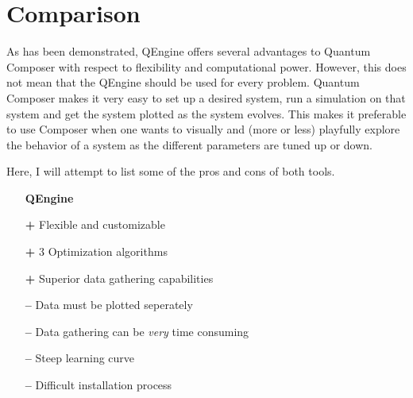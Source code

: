 \documentclass[a4paper, twocolumn]{revtex4-1}
\begin{document}
\section{Comparison}\label{sec:comparison}
As has been demonstrated, QEngine offers several advantages to Quantum Composer with respect to flexibility and computational power. However, this does not mean that the QEngine should be used for every problem. Quantum Composer makes it very easy to set up a desired system, run a simulation on that system and get the system plotted as the system evolves. This makes it preferable to use Composer when one wants to visually and (more or less) playfully explore the behavior of a system as the different parameters are tuned up or down.

Here, I will attempt to list some of the pros and cons of both tools.
\begin{itemize}
	\item[] \textbf{QEngine} 
	\item[\bf+] Flexible and customizable
	\item[\bf+] 3 Optimization algorithms
	\item[\bf+] Superior data gathering capabilities
	\item[\bf{--}] Data must be plotted seperately
	\item[\bf{--}] Data gathering can be \textit{very} time consuming
	\item[\bf{--}] Steep learning curve
	\item[\bf{--}] Difficult installation process
\end{itemize}
\end{document}
